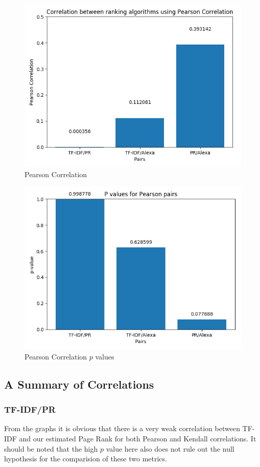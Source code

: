 \documentclass[11pt]{article}
\begin{document}
	\begin{figure}[H]
		\includegraphics[scale=0.5]{resources/pearson.png}
		\caption{Pearson Correlation}
	\end{figure}
	\begin{figure}[H]
		\includegraphics[scale=0.5]{resources/pearson_p.png}
		\caption{Pearson Correlation $p$ values}
	\end{figure}
	\newpage
	\subsection{A Summary of Correlations}
	\subsubsection{TF-IDF/PR}
	\hspace{10mm} From the graphs it is obvious that there is a very weak correlation between TF-IDF and our estimated Page Rank for both Pearson and Kendall correlations. It should be noted that the high $p$ value here also does not rule out the null hypothesis for the comparision of these two metrics. 
\end{document}

